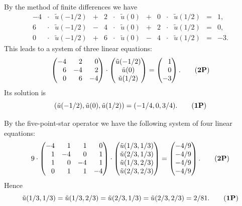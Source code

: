 \begin{loesung}
\begin{teilaufgaben}
\item
By the method of finite differences we have
\[
\renewcommand{\arraycolsep}{1.5pt}
\begin{array}{rclcrclcrclcr}
-4&\cdot&\tilde u(-1/2)&+&2&\cdot&\tilde u(0)&+&0&\cdot&\tilde u(1/2)&=& 1,
\\
 6&\cdot&\tilde u(-1/2)&-&4&\cdot&\tilde u(0)&+&2&\cdot&\tilde u(1/2)&=& 0,
\\
 0&\cdot&\tilde u(-1/2)&+&6&\cdot&\tilde u(0)&-&4&\cdot&\tilde u(1/2)&=&-3.
\end{array}
\]
This leads to a system of three linear equations:
\begin{equation}
\begin{pmatrix*}[r]
-4 &  2 &  0 \\
 6 & -4 &  2 \\
 0 &  6 & -4
\end{pmatrix*}
\cdot
\begin{pmatrix}
\tilde u(-1/2) \\
\tilde u(0) \\
\tilde u(1/2)
\end{pmatrix}
=
\begin{pmatrix*}[r]
 1 \\
 0 \\
-3
\end{pmatrix*}.
\tag{{\bf 2P}}
\end{equation}
Its solution is
\begin{equation}
(\tilde u(-1/2), \tilde u(0), \tilde u(1/2))
=
(-1/4 , 0, 3/4).
\tag{{\bf 1P}}
\end{equation}

\item
By the five-point-star operator we have the following system of
four linear equations: 
\begin{equation}
9
\cdot
\begin{pmatrix*}[r]
-4 &  1 &  1 &  0 \\
 1 & -4 &  0 &  1 \\
 1 &  0 & -4 &  1 \\
 0 &  1 &  1 & -4
\end{pmatrix*}
\cdot
\begin{pmatrix}
\tilde u(1/3,1/3) \\
\tilde u(2/3,1/3) \\
\tilde u(1/3,2/3) \\
\tilde u(2/3,2/3)
\end{pmatrix}
=
\begin{pmatrix}
-4/9 \\
-4/9 \\
-4/9 \\
-4/9
\end{pmatrix}.
\tag{{\bf 2P}}
\end{equation}
Hence
\begin{equation}
\tilde u(1/3,1/3)
=
\tilde u(1/3,2/3)
=
\tilde u(2/3,1/3)
=
\tilde u(2/3,2/3)
=
2/81.
\tag{{\bf 1P}}
\end{equation}
\end{teilaufgaben}
\end{loesung}

